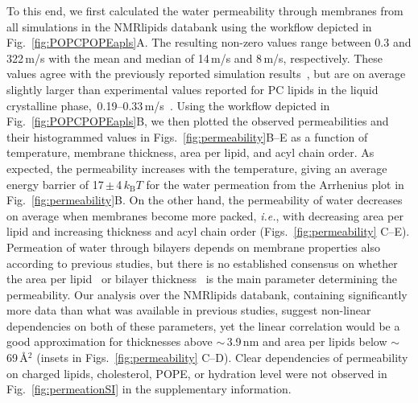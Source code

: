 \documentclass[fleqn,10pt]{wlscirep}
\begin{document}
To this end, we first calculated the water permeability through membranes from all simulations in the NMRlipids databank using the workflow depicted in Fig.~\ref{fig:POPCPOPEapls}A. The resulting non-zero values range between 0.3 and 322\,\textmu{}m/s with the mean and median of 14\,\textmu{}m/s and 8\,\textmu{}m/s, respectively. These values agree with the previously reported simulation results~\cite{venable19,camilo2022}, but are on average slightly larger than experimental values reported for PC lipids in the liquid crystalline phase,~0.19--0.33\,\textmu{}m/s~\cite{jansen95}. Using the workflow depicted in Fig.~\ref{fig:POPCPOPEapls}B, we then plotted the observed permeabilities and their histogrammed values in Figs.~\ref{fig:permeability}B--E as a function of temperature, membrane thickness, area per lipid, and acyl chain order. As expected, the permeability increases with the temperature, giving an average energy barrier of 17\,$\pm$\,4\,$k_\mathrm{B}T$ for the water permeation from the Arrhenius plot in Fig.~\ref{fig:permeability}B. On the other hand, the permeability of water decreases on average when membranes become more packed, \textit{i.e.}, with decreasing area per lipid and increasing thickness and acyl chain order (Figs.~\ref{fig:permeability} C--E). Permeation of water through bilayers depends on membrane properties also according to previous studies, but there is no established consensus on whether the area per lipid~\cite{nagle08} or bilayer thickness~\cite{frallicciardi22} is the main parameter determining the permeability. 
Our analysis over the NMRlipids databank, containing significantly more data than what was available in previous studies, suggest non-linear dependencies on both of these parameters, yet the linear correlation would be a good approximation for thicknesses above $\sim$\,3.9\,nm and area per lipids below $\sim$69\,\AA{}$^2$ (insets in Figs.~\ref{fig:permeability} C--D).
Clear dependencies of permeability on charged lipids, cholesterol, POPE, or hydration level were not observed in Fig.~\ref{fig:permeationSI} in the supplementary information.
%
%
%
\end{document}
